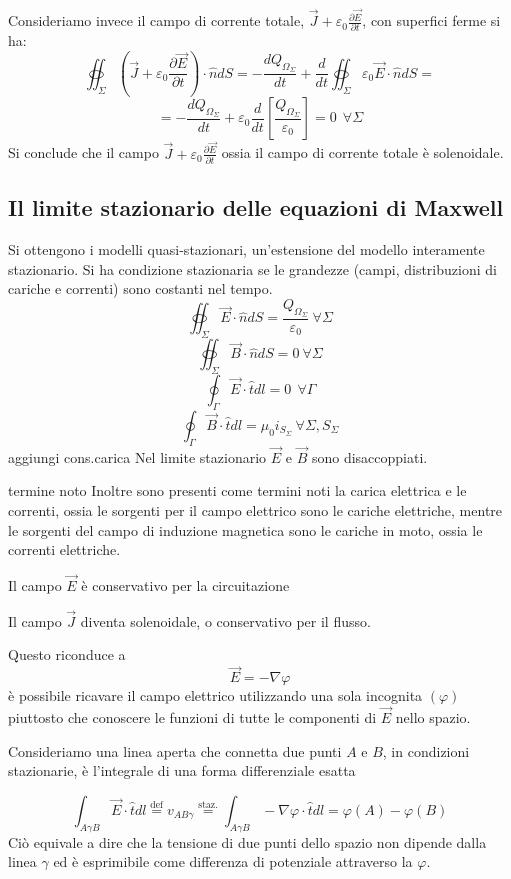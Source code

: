 Consideriamo invece il campo di corrente totale, $\vec{J} + \varepsilon_0\frac{\partial\vec{E}}{\partial t}$, con superfici ferme si ha:
$$
\oiint_{\Sigma} \left(\vec{J} + \varepsilon_0\frac{\partial\vec{E}}{\partial t}\right)\cdot\hat{n}dS = 
-\frac{dQ_{\Omega_\Sigma}}{dt} + \frac{d}{dt} \oiint_{\Sigma} \varepsilon_0\vec{E}\cdot\hat{n}dS =
$$
$$
= -\frac{dQ_{\Omega_\Sigma}}{dt} + \varepsilon_0\frac{d}{dt}\left[\frac{Q_{\Omega_\Sigma}}{\varepsilon_0}\right] = 0\ \ \forall\Sigma
$$
Si conclude che il campo $\vec{J} + \varepsilon_0\frac{\partial\vec{E}}{\partial t} $ ossia
il campo di corrente totale è solenoidale.


\subsection{Il limite stazionario delle equazioni di Maxwell}
Si ottengono i modelli quasi-stazionari, un'estensione del modello interamente stazionario.
Si ha condizione stazionaria se le grandezze (campi, distribuzioni di cariche e correnti) sono 
costanti nel tempo.
$$
\oiint_{\Sigma}\vec{E}\cdot\hat{n}dS = \frac{Q_{\Omega_\Sigma}}{\varepsilon_0} \ \forall \Sigma
$$
$$
\oiint_{\Sigma}\vec{B}\cdot\hat{n}dS = 0 \ \forall\Sigma
$$
$$
\oint_{\Gamma} \vec{E}\cdot\hat{t}dl = 0 \ \ \forall \Gamma
$$
$$
\oint_{\Gamma}\vec{B}\cdot\hat{t} dl = \mu_0 i_{S_\Sigma}\ \forall \Sigma,S_\Sigma
$$
aggiungi cons.carica
Nel limite stazionario $\vec{E}$ e $\vec{B}$ sono disaccoppiati.

termine noto
Inoltre sono presenti come termini noti la carica elettrica e le correnti, ossia le sorgenti
per il campo elettrico sono le cariche elettriche, mentre le sorgenti del campo di induzione magnetica
sono le cariche in moto, ossia le correnti elettriche.

Il campo $\vec{E}$ è conservativo per la circuitazione

Il campo $\vec{J}$ diventa solenoidale, o conservativo per il flusso.

Questo riconduce a
$$
\vec{E} = -\nabla\varphi
$$
è possibile ricavare il campo elettrico utilizzando una sola incognita $(\varphi)$ piuttosto che
conoscere le funzioni di tutte le componenti di $\vec{E}$ nello spazio.

Consideriamo una linea aperta che connetta due punti $A$ e $B$, in condizioni stazionarie, è l'integrale di una forma differenziale esatta

$$
\int_{A\gamma B}\vec{E}\cdot\hat{t}dl \stackrel{\text{def}}{=} v_{AB\gamma} \stackrel{\text{staz.}}{=}
\int_{A\gamma B}-\nabla\varphi\cdot\hat{t}dl =\varphi(A)-\varphi(B)
$$
Ciò equivale a dire che la tensione di due punti dello spazio non dipende dalla linea $\gamma$ ed è
esprimibile come differenza di potenziale attraverso la $\varphi$.

